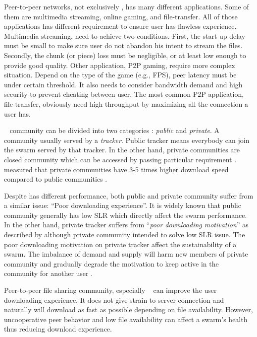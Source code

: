Peer-to-peer networks, not exclusively \bt, has many different applications. Some of them are multimedia streaming, online gaming, and file-transfer. All of those applications has different requirement to ensure user has flawless experience. Multimedia streaming, need 
to achieve two conditions. First, the start up delay must be small to make sure user do not abandon his intent to stream the files. Secondly, the chunk (or piece) loss must be negligible, or at least low enough to provide good quality\cite{2008:givetogetvod:Mol}. Other application, P2P gaming, require more complex situation. Depend on the type of the game (e.g., FPS), peer latency must be under certain threshold\cite{2010:surveyp2pgame:shen}. It also needs to consider bandwidth demand and high security to prevent cheating between user. The most common P2P application, file transfer, obviously need high throughput by maximizing all the connection a user has.

\bt~ community can be divided into two categories : \textit{public} and \textit{private}. A community usually served by a \textit{tracker}. Public tracker means everybody can join the swarm served by that tracker. In the other hand, private communities are closed community which can be accessed by passing particular requirement \cite{2010:pubpriv:meulpolder, 2014:sustainabilitytorrent:chen}. \citeauthor{2010:pubpriv:meulpolder} measured that private communities have 3-5 times higher download speed compared to public communities \cite{2010:pubpriv:meulpolder}.

Despite has different performance, both public and private community suffer from a similar issue: ``Poor downloading experience''. It is widely known that public community generally has low SLR which directly affect the swarm performance. In the other hand, private tracker suffers from ``\textit{poor downloading motivation}'' as described by \citeauthor{2014:sustainabilitytorrent:chen}\cite{2014:sustainabilitytorrent:chen} although private community intended to solve low SLR issue. The poor downloading motivation on private tracker affect the sustainability of a swarm. The imbalance of demand and supply will harm new members of private community and gradually degrade the motivation to keep active in the community for another user \cite{2014:sustainabilitytorrent:chen}.

Peer-to-peer file sharing community, especially \bt~ can improve the user downloading experience. It does not give strain to server connection and naturally will download as fast as possible depending on file availability. However, uncooperative peer behavior and low file availability can affect a swarm's health thus reducing download experience.

